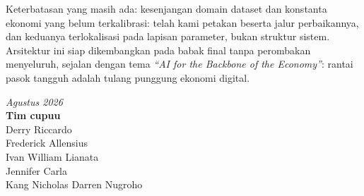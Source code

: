 \documentclass[12pt,a4paper]{article}
\begin{document}
Keterbatasan yang masih ada: kesenjangan domain dataset dan konstanta ekonomi yang belum terkalibrasi: telah kami petakan beserta jalur perbaikannya, dan keduanya terlokalisasi pada lapisan parameter, bukan struktur sistem. Arsitektur ini siap dikembangkan pada babak final tanpa perombakan menyeluruh, sejalan dengan tema \textit{``AI for the Backbone of the Economy''}: rantai pasok tangguh adalah tulang punggung ekonomi digital.

\begin{flushright}
  \textit{Agustus 2026}\\[4pt]
  \textbf{Tim cupuu}\\[2pt]
  Derry Riccardo\\
  Frederick Allensius\\
  Ivan William Lianata\\
  Jennifer Carla\\
  Kang Nicholas Darren Nugroho
\end{flushright}
\end{document}
